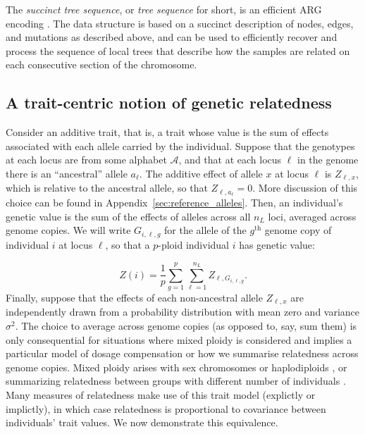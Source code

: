 The \textit{succinct tree sequence}, or \textit{tree sequence} for short,
is an efficient ARG encoding \citep{kelleher2016efficient, kelleher2018efficient, wong2023general}.
%
The data structure is based on a succinct description of nodes, edges,
and mutations as described above,
and can be used to efficiently recover and process
the sequence of local trees that describe how the samples are related
on each consecutive section of the chromosome.
%


\subsection{A trait-centric notion of genetic relatedness}  

Consider an additive trait, that is, a trait whose value is
the sum of effects associated with each allele carried by the individual.
%
Suppose that the genotypes at each locus are from some alphabet $\mathcal{A}$,
and that at each locus $\ell$ in the genome there is an ``ancestral'' allele $a_\ell$.
%
The additive effect of allele $x$ at locus $\ell$ is $Z_{\ell,x}$,
which is relative to the ancestral allele, so that $Z_{\ell,a_\ell} = 0$.
%
More discussion of this choice can be found in Appendix~\ref{sec:reference_alleles}.
%
Then, an individual's genetic value is the sum of
the effects of alleles across all $n_L$ loci, %
averaged across genome copies.
%
We will write $G_{i,\ell,g}$ for %
the allele of the $g^\text{th}$ genome copy of individual $i$ at locus $\ell$,
so that a $p$-ploid individual $i$ has genetic value: %
%

$$
Z(i) = \frac{1}{p} \sum_{g=1}^p \sum_{\ell=1}^{n_L} Z_{\ell,G_{i,\ell,g}}.
$$
%
Finally, suppose that the effects of each non-ancestral allele $Z_{\ell,x}$
are independently drawn from a probability distribution with mean zero and variance $\sigma^2$.
%
The choice to average across genome copies (as opposed to, say, sum them)
is only consequential for situations where mixed ploidy is considered
and implies a particular model of dosage compensation or
how we summarise relatedness across genome copies.
%
Mixed ploidy arises with sex chromosomes or haplodiploids \citep{grossman1989inbreeding},
or summarizing relatedness between groups with different number of individuals \citep{cockerham1976group}.
%
Many measures of relatedness make use of this trait model (explictly or implictly),
in which case relatedness is proportional to covariance between individuals' trait values.
%
We now demonstrate this equivalence.


